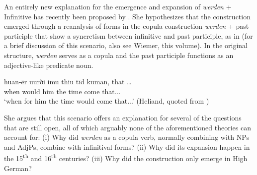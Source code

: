 \documentclass[output=paper,colorlinks,citecolor=brown]{langscibook}
\begin{document}
 An entirely new explanation for the emergence and expansion of \textit{werden} + Infinitive has recently been proposed by \citet[]{Jäger2024}{}.  She hypothesizes that the construction emerged through a reanalysis of forms in the copula construction \textit{werden} + past participle that show a syncretism between infinitive and past participle, as in  (for a brief discussion of this scenario, also see Wiemer, this volume). In the original structure, \textit{werden} serves as a copula and the past participle functions as an adjective-like predicate noun.  

\ea \label{ex:hs:jaeger}
    \gll huan-ēr uurði imu thiu tīd kuman, that …\\
    when would him the time come that...\\
    \glt `when for him the time would come that...' (Heliand, quoted from \cite[191]{Jäger2024})  \\
    \z

She argues that this scenario offers an explanation for several of the questions that are still open, all of which arguably none of the aforementioned theories can account for: (i) Why did \textit{werden} as a copula verb, normally combining with NPs and AdjPs, combine with infinitival forms? (ii) Why did its expansion happen in the 15\textsuperscript{th} and 16\textsuperscript{th} centuries? (iii) Why did the construction only emerge in High German? 
\end{document}
